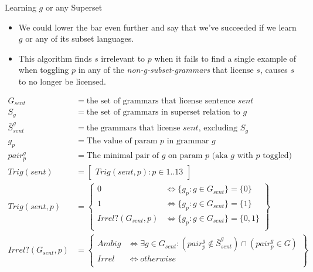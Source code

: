 \documentclass[presentation]{beamer}
\begin{document}
\begin{frame}[shrink=12,label={sec:org2530460}]{Learning \(g\) or any Superset}
\begin{itemize}
\item We could lower the bar even further and say that we've succeeded if we learn
\(g\) or any of its subset languages.
\item This algorithm finds \(s\) irrelevant to \(p\) when it fails to find a single
example of when toggling \(p\) in any of the \emph{non-g-subset-grammars} that
license \(s\), causes \(s\) to no longer be licensed.
\end{itemize}

\begin{align*}
G_{sent} &= \text{the set of grammars that license sentence $sent$} \\
S_g &= \text{the set of grammars in superset relation to $g$} \\
\bar{S}_{sent}^g &= \text{the grammars that license $sent$, excluding $S_g$} \\
g_p &= \text{The value of param $p$ in grammar $g$} \\
pair_p^g &= \text{The minimal pair of $g$ on param $p$ (aka $g$ with $p$ toggled)} \\
  Trig(sent) &= \begin{bmatrix} Trig(sent, p) : p \in 1..13 \end{bmatrix} \\
  Trig(sent, p) &= \left\{\begin{array}{lr}
      0                        & \iff \{g_p : g \in G_{sent} \} = \{0\} \\
      1                        & \iff \{g_p : g \in G_{sent} \} = \{1\}\\
      Irrel?(G_{sent}, p) & \iff \{g_p : g \in G_{sent} \} = \{0, 1\} \\
      \end{array}\right\} \\
Irrel?(G_{sent}, p) &= \left\{\begin{array}{lr}
      Ambig                        & \iff \exists g \in G_{sent} :
                                     (pair_p^g \notin \bar{S}_{sent}^g) \cap (pair_p^g \in G) \\
      Irrel                        & \iff  otherwise \\
      \end{array}\right\} \\
\end{align*}
\end{frame}
\end{document}
